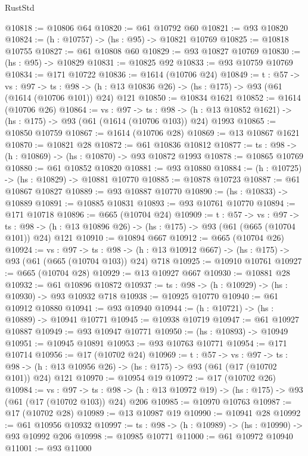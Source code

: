 \begin{lexlean}{RustStd}
\begin{coremodule}
@10818 := @10806 @64
@10820 := @61 @10792 @60
@10821 := @93 @10820
@10824 := (h : @10757) -> (hs : @95) -> @10821 @10769
@10825 := @10818 @10755
@10827 := @61 @10808 @60
@10829 := @93 @10827 @10769
@10830 := (hs : @95) -> @10829
@10831 := @10825 @92
@10833 := @93 @10759 @10769
@10834 := @171 @10722
@10836 := @1614 (@10706 @24)
@10849 := {t : @57} ->
  {vs : @97} ->
  {ts : @98} -> (h : @13 @10836 @26) -> (hs : @175) -> @93 (@61 (@1614 (@10706 @101)) @24) @121
@10850 := @10834 @1621
@10852 := @1614 (@10706 @26)
@10864 := {vs : @97} ->
  {ts : @98} -> (h : @13 @10852 @1621) -> (hs : @175) -> @93 (@61 (@1614 (@10706 @103)) @24) @1993
@10865 := @10850 @10759
@10867 := @1614 (@10706 @28)
@10869 := @13 @10867 @1621
@10870 := @10821 @28
@10872 := @61 @10836 @10812
@10877 := {ts : @98} -> (h : @10869) -> (hs : @10870) -> @93 @10872 @1993
@10878 := @10865 @10769
@10880 := @61 @10852 @10820
@10881 := @93 @10880
@10884 := (h : @10725) -> (hs : @10829) -> @10881 @10770
@10885 := @10878 @10723
@10887 := @61 @10867 @10827
@10889 := @93 @10887 @10770
@10890 := (hs : @10833) -> @10889
@10891 := @10885 @10831
@10893 := @93 @10761 @10770
@10894 := @171 @10718
@10896 := @665 (@10704 @24)
@10909 := {t : @57} ->
  {vs : @97} ->
  {ts : @98} -> (h : @13 @10896 @26) -> (hs : @175) -> @93 (@61 (@665 (@10704 @101)) @24) @121
@10910 := @10894 @667
@10912 := @665 (@10704 @26)
@10924 := {vs : @97} ->
  {ts : @98} -> (h : @13 @10912 @667) -> (hs : @175) -> @93 (@61 (@665 (@10704 @103)) @24) @718
@10925 := @10910 @10761
@10927 := @665 (@10704 @28)
@10929 := @13 @10927 @667
@10930 := @10881 @28
@10932 := @61 @10896 @10872
@10937 := {ts : @98} -> (h : @10929) -> (hs : @10930) -> @93 @10932 @718
@10938 := @10925 @10770
@10940 := @61 @10912 @10880
@10941 := @93 @10940
@10944 := (h : @10721) -> (hs : @10889) -> @10941 @10771
@10945 := @10938 @10719
@10947 := @61 @10927 @10887
@10949 := @93 @10947 @10771
@10950 := (hs : @10893) -> @10949
@10951 := @10945 @10891
@10953 := @93 @10763 @10771
@10954 := @171 @10714
@10956 := @17 (@10702 @24)
@10969 := {t : @57} ->
  {vs : @97} ->
  {ts : @98} -> (h : @13 @10956 @26) -> (hs : @175) -> @93 (@61 (@17 (@10702 @101)) @24) @121
@10970 := @10954 @19
@10972 := @17 (@10702 @26)
@10984 := {vs : @97} ->
  {ts : @98} -> (h : @13 @10972 @19) -> (hs : @175) -> @93 (@61 (@17 (@10702 @103)) @24) @206
@10985 := @10970 @10763
@10987 := @17 (@10702 @28)
@10989 := @13 @10987 @19
@10990 := @10941 @28
@10992 := @61 @10956 @10932
@10997 := {ts : @98} -> (h : @10989) -> (hs : @10990) -> @93 @10992 @206
@10998 := @10985 @10771
@11000 := @61 @10972 @10940
@11001 := @93 @11000

\end{coremodule}
\end{lexlean}
